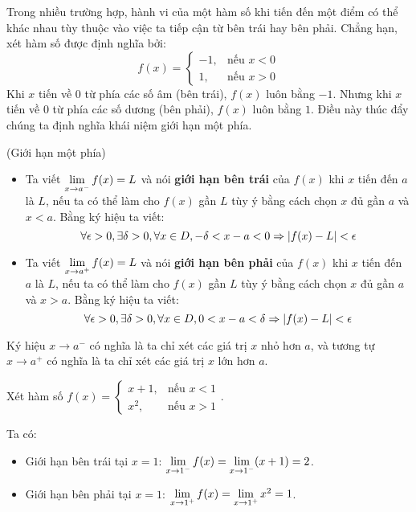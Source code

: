 Trong nhiều trường hợp, hành vi của một hàm số khi tiến đến một điểm có thể khác nhau tùy thuộc vào việc ta tiếp cận từ bên trái hay bên phải. Chẳng hạn, xét hàm số được định nghĩa bởi:
\begin{equation*}
    f(x) = \begin{cases}
        -1, & \text{nếu } x < 0 \\
        1,  & \text{nếu } x > 0
    \end{cases}
\end{equation*}
Khi $x$ tiến về 0 từ phía các số âm (bên trái), $f(x)$ luôn bằng $-1$. Nhưng khi $x$ tiến về 0 từ phía các số dương (bên phải), $f(x)$ luôn bằng $1$. Điều này thúc đẩy chúng ta định nghĩa khái niệm giới hạn một phía.

\begin{definition} (Giới hạn một phía)
    \begin{itemize}
        \item Ta viết $\lim\limits_{x \to a^{-}} f(x) = L$ và nói \textbf{giới hạn bên trái} của $f(x)$ khi $x$ tiến đến $a$ là $L$, nếu ta có thể làm cho $f(x)$ gần $L$ tùy ý bằng cách chọn $x$ đủ gần $a$ và $x < a$. Bằng ký hiệu ta viết:
        \[\forall \epsilon > 0, \exists \delta > 0, \forall x \in D, -\delta < x - a < 0 \Rightarrow \left\lvert f(x) - L \right\rvert < \epsilon\]
        
        \item Ta viết $\lim\limits_{x \to a^{+}} f(x) = L$ và nói \textbf{giới hạn bên phải} của $f(x)$ khi $x$ tiến đến $a$ là $L$, nếu ta có thể làm cho $f(x)$ gần $L$ tùy ý bằng cách chọn $x$ đủ gần $a$ và $x > a$. Bằng ký hiệu ta viết:
        \[\forall \epsilon > 0, \exists \delta > 0, \forall x \in D, 0 < x - a < \delta \Rightarrow \left\lvert f(x) - L \right\rvert < \epsilon\]
    \end{itemize}
\end{definition}

Ký hiệu $x \to a^{-}$ có nghĩa là ta chỉ xét các giá trị $x$ nhỏ hơn $a$, và tương tự $x \to a^{+}$ có nghĩa là ta chỉ xét các giá trị $x$ lớn hơn $a$.

\begin{example}
    Xét hàm số $f(x) = \begin{cases} x+1, & \text{nếu } x < 1 \\ x^2, & \text{nếu } x > 1 \end{cases}$.
    
    Ta có:
    \begin{itemize}
        \item Giới hạn bên trái tại $x=1$: $\lim\limits_{x \to 1^{-}} f(x) = \lim\limits_{x \to 1^{-}} (x+1) = 2$.
        \item Giới hạn bên phải tại $x=1$: $\lim\limits_{x \to 1^{+}} f(x) = \lim\limits_{x \to 1^{+}} x^2 = 1$.
    \end{itemize}
\end{example}

